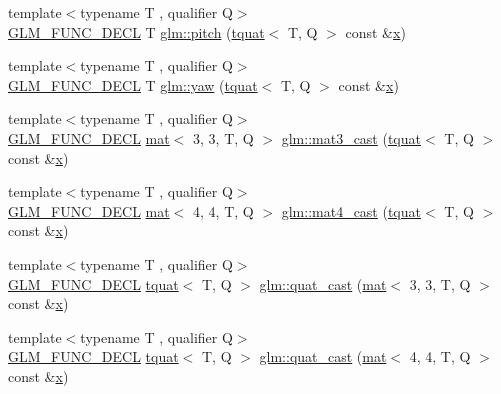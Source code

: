 \begin{DoxyCompactItemize}
\item 
{\footnotesize template$<$typename T , qualifier Q$>$ }\\\hyperlink{setup_8hpp_ab2d052de21a70539923e9bcbf6e83a51}{G\+L\+M\+\_\+\+F\+U\+N\+C\+\_\+\+D\+E\+CL} T \hyperlink{group__gtc__quaternion_ga9bd78e5fe153d07e39fb4c83e73dba73}{glm\+::pitch} (\hyperlink{structglm_1_1tquat}{tquat}$<$ T, Q $>$ const \&\hyperlink{_s_d_l__opengl_8h_ad0e63d0edcdbd3d79554076bf309fd47}{x})
\item 
{\footnotesize template$<$typename T , qualifier Q$>$ }\\\hyperlink{setup_8hpp_ab2d052de21a70539923e9bcbf6e83a51}{G\+L\+M\+\_\+\+F\+U\+N\+C\+\_\+\+D\+E\+CL} T \hyperlink{group__gtc__quaternion_ga53feffeb4001b99e36e216522e465e9e}{glm\+::yaw} (\hyperlink{structglm_1_1tquat}{tquat}$<$ T, Q $>$ const \&\hyperlink{_s_d_l__opengl_8h_ad0e63d0edcdbd3d79554076bf309fd47}{x})
\item 
{\footnotesize template$<$typename T , qualifier Q$>$ }\\\hyperlink{setup_8hpp_ab2d052de21a70539923e9bcbf6e83a51}{G\+L\+M\+\_\+\+F\+U\+N\+C\+\_\+\+D\+E\+CL} \hyperlink{structglm_1_1mat}{mat}$<$ 3, 3, T, Q $>$ \hyperlink{group__gtc__quaternion_ga6e88f15c94effe737c876d21ea0db101}{glm\+::mat3\+\_\+cast} (\hyperlink{structglm_1_1tquat}{tquat}$<$ T, Q $>$ const \&\hyperlink{_s_d_l__opengl_8h_ad0e63d0edcdbd3d79554076bf309fd47}{x})
\item 
{\footnotesize template$<$typename T , qualifier Q$>$ }\\\hyperlink{setup_8hpp_ab2d052de21a70539923e9bcbf6e83a51}{G\+L\+M\+\_\+\+F\+U\+N\+C\+\_\+\+D\+E\+CL} \hyperlink{structglm_1_1mat}{mat}$<$ 4, 4, T, Q $>$ \hyperlink{group__gtc__quaternion_ga8e2085f17cd5aae423c04536524f11b3}{glm\+::mat4\+\_\+cast} (\hyperlink{structglm_1_1tquat}{tquat}$<$ T, Q $>$ const \&\hyperlink{_s_d_l__opengl_8h_ad0e63d0edcdbd3d79554076bf309fd47}{x})
\item 
{\footnotesize template$<$typename T , qualifier Q$>$ }\\\hyperlink{setup_8hpp_ab2d052de21a70539923e9bcbf6e83a51}{G\+L\+M\+\_\+\+F\+U\+N\+C\+\_\+\+D\+E\+CL} \hyperlink{structglm_1_1tquat}{tquat}$<$ T, Q $>$ \hyperlink{group__gtc__quaternion_ga03e023aec9acd561a28594bbc8a3abf6}{glm\+::quat\+\_\+cast} (\hyperlink{structglm_1_1mat}{mat}$<$ 3, 3, T, Q $>$ const \&\hyperlink{_s_d_l__opengl_8h_ad0e63d0edcdbd3d79554076bf309fd47}{x})
\item 
{\footnotesize template$<$typename T , qualifier Q$>$ }\\\hyperlink{setup_8hpp_ab2d052de21a70539923e9bcbf6e83a51}{G\+L\+M\+\_\+\+F\+U\+N\+C\+\_\+\+D\+E\+CL} \hyperlink{structglm_1_1tquat}{tquat}$<$ T, Q $>$ \hyperlink{group__gtc__quaternion_ga50bb9aecf42fdab04e16039ab6a81c60}{glm\+::quat\+\_\+cast} (\hyperlink{structglm_1_1mat}{mat}$<$ 4, 4, T, Q $>$ const \&\hyperlink{_s_d_l__opengl_8h_ad0e63d0edcdbd3d79554076bf309fd47}{x})

\end{DoxyCompactItemize}
